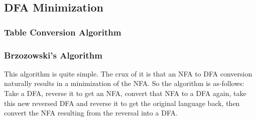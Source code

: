 \subsection{DFA Minimization}

    \subsubsection{Table Conversion Algorithm}
    \subsubsection{Brzozowski's Algorithm}
    This algorithm is quite simple. The crux of it is that an NFA to DFA conversion
    naturally results in a minimization of the NFA. So the algorithm is as-follows:
    Take a DFA, reverse it to get an NFA, convert that NFA to a DFA again, take
    this new reversed DFA and reverse it to get the original language back, then
    convert the NFA resulting from the reversal into a DFA.
